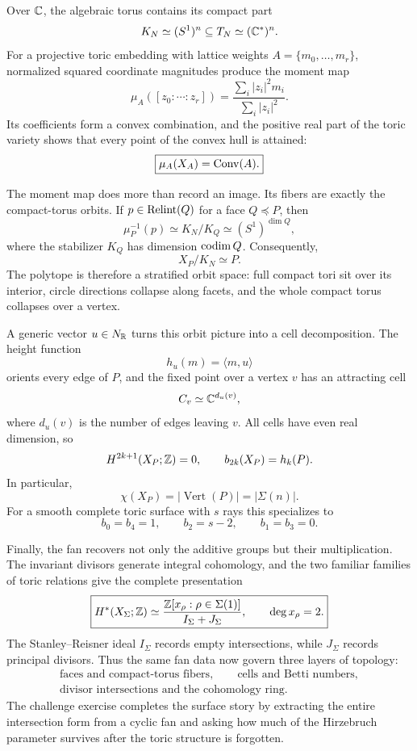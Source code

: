 Over \(\mathbb{C}\), the algebraic torus contains its compact part
\[
K_N\simeq(S^1)^n\subseteq T_N\simeq(\mathbb{C}^*)^n.
\]
For a projective toric embedding with lattice weights
\(A=\{m_0,\ldots,m_r\}\), normalized squared coordinate magnitudes
produce the moment map
\[
\mu_A([z_0:\cdots:z_r])
=
\frac{\sum_i|z_i|^2m_i}{\sum_i|z_i|^2}.
\]
Its coefficients form a convex combination, and the positive real
part of the toric variety shows that every point of the convex hull is
attained:
\[
\boxed{\mu_A(X_A)=\operatorname{Conv}(A).}
\]

The moment map does more than record an image. Its fibers are exactly
the compact-torus orbits. If \(p\in\operatorname{Relint}(Q)\) for a
face \(Q\preceq P\), then
\[
\mu_P^{-1}(p)
\simeq K_N/K_Q
\simeq(S^1)^{\dim Q},
\]
where the stabilizer \(K_Q\) has dimension \(\operatorname{codim} Q\). Consequently,
\[
\boxed{X_P/K_N\simeq P.}
\]
The polytope is therefore a stratified orbit space: full compact tori
sit over its interior, circle directions collapse along facets, and
the whole compact torus collapses over a vertex.

A generic vector \(u\in N_{\mathbb{R}}\) turns this orbit picture into a cell
decomposition. The height function
\[
h_u(m)=\langle m,u\rangle
\]
orients every edge of \(P\), and the fixed point over a vertex \(v\)
has an attracting cell
\[
C_v\simeq\mathbb{C}^{d_u(v)},
\]
where \(d_u(v)\) is the number of edges leaving \(v\). All cells have
even real dimension, so
\[
H^{2k+1}(X_P;\mathbb{Z})=0,
\qquad
b_{2k}(X_P)=h_k(P).
\]
In particular,
\[
\chi(X_P)=|\operatorname{Vert}(P)|=|\Sigma(n)|.
\]
For a smooth complete toric surface with \(s\) rays this specializes to
\[
b_0=b_4=1,
\qquad
b_2=s-2,
\qquad
b_1=b_3=0.
\]

Finally, the fan recovers not only the additive groups but their
multiplication. The invariant divisors generate integral cohomology,
and the two familiar families of toric relations give the complete
presentation
\[
\boxed{
H^*(X_\Sigma;\mathbb{Z})
\simeq
\frac{\mathbb{Z}[x_\rho:\rho\in\Sigma(1)]}
     {I_\Sigma+J_\Sigma},
\qquad
\deg x_\rho=2.
}
\]
The Stanley--Reisner ideal \(I_\Sigma\) records empty intersections,
while \(J_\Sigma\) records principal divisors. Thus the same fan data
now govern three layers of topology:
\[
\boxed{
\begin{gathered}
\text{faces and compact-torus fibers},
\qquad
\text{cells and Betti numbers},
\\[-1mm]
\text{divisor intersections and the cohomology ring}.
\end{gathered}}
\]
The challenge exercise completes the surface story by extracting the
entire intersection form from a cyclic fan and asking how much of the
Hirzebruch parameter survives after the toric structure is forgotten.

